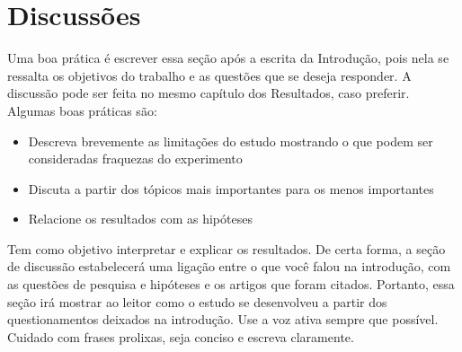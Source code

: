 \chapter{Discussões}
\label{ch:discussoes}
Uma boa prática é escrever essa seção após a escrita da Introdução, pois nela se ressalta os objetivos do trabalho e as questões que se deseja responder. A discussão pode ser feita no mesmo capítulo dos Resultados, caso preferir. Algumas boas práticas são:

\begin{itemize}
	\item Descreva brevemente as limitações do estudo mostrando o que podem ser consideradas fraquezas do experimento
	\item Discuta a partir dos tópicos mais importantes para os menos importantes
	\item Relacione os resultados com as hipóteses
\end{itemize}

Tem como objetivo interpretar e explicar os resultados. De certa forma, a seção de discussão estabelecerá uma ligação entre o que você falou na introdução, com as questões de pesquisa e hipóteses e os artigos que foram citados. Portanto, essa seção irá mostrar ao leitor como o estudo se desenvolveu a partir dos questionamentos deixados na introdução. Use a voz ativa sempre que possível. Cuidado com frases prolixas, seja conciso e escreva claramente.

